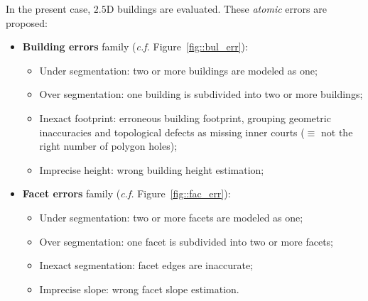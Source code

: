 \documentclass[runningheads]{llncs}
\begin{document}
In the present case, $2.5$D buildings are evaluated. These \textit{atomic} errors are proposed:
	\begin{itemize}
		\item \textbf{Building errors} family (\textit{c.f.} Figure~\ref{fig::bul_err}):
        \begin{itemize}
        	\item Under segmentation: two or more buildings are modeled as one;
            \item Over segmentation: one building is subdivided into two or more buildings;
            \item Inexact footprint: erroneous building footprint, grouping geometric inaccuracies and topological defects as missing inner courts ($\equiv$ not the right number of polygon holes);
            \item Imprecise height: wrong building height estimation;
        \end{itemize}
		\item \textbf{Facet errors} family (\textit{c.f.} Figure~\ref{fig::fac_err}):
        \begin{itemize}
        	\item Under segmentation: two or more facets are modeled as one;
            \item Over segmentation: one facet is subdivided into two or more facets;
            \item Inexact segmentation: facet edges are inaccurate;
            \item Imprecise slope: wrong facet slope estimation.
        \end{itemize}
	\end{itemize}
\end{document}
